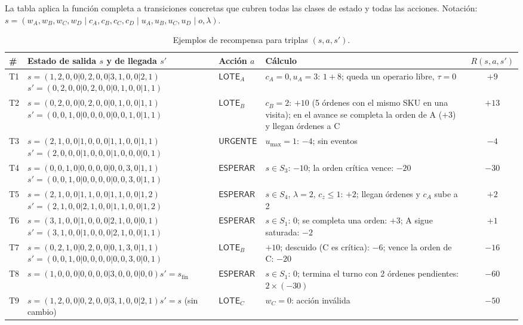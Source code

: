 \documentclass[11pt,letterpaper]{article}
\newcommand{\LOTE}[1]{\mathsf{LOTE}_{#1}}
\newcommand{\URG}{\mathsf{URGENTE}}
\newcommand{\ESP}{\mathsf{ESPERAR}}
\newcommand{\sfin}{s_{\mathrm{fin}}}
\newcommand{\umax}{u_{\max}}
\begin{document}
La tabla aplica la función completa a transiciones concretas que cubren todas las clases de estado
y todas las acciones. Notación: $s=(w_A,w_B,w_C,w_D \mid c_A,c_B,c_C,c_D \mid u_A,u_B,u_C,u_D \mid o,\lambda)$.

\begin{table}[h]
\centering\footnotesize
\setlength{\tabcolsep}{4pt}
\begin{tabularx}{\textwidth}{@{}p{0.5cm}p{5.0cm}p{1.6cm}Lc@{}}
\toprule
\textbf{\#} & \textbf{Estado de salida $s$ y de llegada $s'$} & \textbf{Acción $a$} & \textbf{Cálculo} & \textbf{$R(s,a,s')$} \\
\midrule
T1 & $s=(1,2,0,0|0,2,0,0|3,1,0,0|2,1)$\newline $s'=(0,2,0,0|0,2,0,0|0,1,0,0|1,1)$ & $\LOTE{A}$ & $c_A=0,u_A=3$: $1+8$; queda un operario libre, $\tau=0$ & $+9$ \\
\addlinespace[2pt]
T2 & $s=(0,2,0,0|0,2,0,0|0,1,0,0|1,1)$\newline $s'=(0,0,1,0|0,0,0,0|0,0,1,0|1,1)$ & $\LOTE{B}$ & $c_B=2$: $+10$ (5 órdenes con el mismo SKU en una visita); en el avance se completa la orden de A ($+3$) y llegan órdenes a C & $+13$ \\
\addlinespace[2pt]
T3 & $s=(2,1,0,0|1,0,0,0|1,1,0,0|1,1)$\newline $s'=(2,0,0,0|1,0,0,0|1,0,0,0|0,1)$ & $\URG$ & $\umax=1$: $-4$; sin eventos & $-4$ \\
\addlinespace[2pt]
T4 & $s=(0,0,1,0|0,0,0,0|0,0,3,0|1,1)$\newline $s'=(0,0,1,0|0,0,0,0|0,0,3,0|1,1)$ & $\ESP$ & $s\in S_3$: $-10$; la orden crítica vence: $-20$ & $-30$ \\
\addlinespace[2pt]
T5 & $s=(2,1,0,0|1,1,0,0|1,1,0,0|1,2)$\newline $s'=(2,1,0,0|2,1,0,0|1,1,0,0|1,2)$ & $\ESP$ & $s\in S_4$, $\lambda=2$, $c_z\le1$: $+2$; llegan órdenes y $c_A$ sube a 2 & $+2$ \\
\addlinespace[2pt]
T6 & $s=(3,1,0,0|1,0,0,0|2,1,0,0|0,1)$\newline $s'=(3,1,0,0|1,0,0,0|2,1,0,0|1,1)$ & $\ESP$ & $s\in S_1$: $0$; se completa una orden: $+3$; A sigue saturada: $-2$ & $+1$ \\
\addlinespace[2pt]
T7 & $s=(0,2,1,0|0,2,0,0|0,1,3,0|1,1)$\newline $s'=(0,0,1,0|0,0,0,0|0,0,3,0|0,1)$ & $\LOTE{B}$ & $+10$; descuido (C es crítica): $-6$; vence la orden de C: $-20$ & $-16$ \\
\addlinespace[2pt]
T8 & $s=(1,0,0,0|0,0,0,0|3,0,0,0|0,0)$\newline $s'=\sfin$ & $\ESP$ & $s\in S_1$: $0$; termina el turno con 2 órdenes pendientes: $2\times(-30)$ & $-60$ \\
\addlinespace[2pt]
T9 & $s=(1,2,0,0|0,2,0,0|3,1,0,0|2,1)$\newline $s'=s$ (sin cambio) & $\LOTE{C}$ & $w_C=0$: acción inválida & $-50$ \\
\bottomrule
\end{tabularx}
\caption{Ejemplos de recompensa para triplas $(s,a,s')$.}
\end{table}
\end{document}

